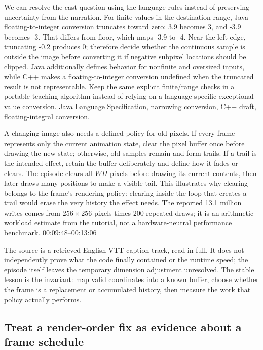 We can resolve the cast question using the language rules instead of preserving uncertainty from the narration. For finite values in the destination range, Java floating-to-integer conversion truncates toward zero: 3.9 becomes 3, and -3.9 becomes -3. That differs from floor, which maps -3.9 to -4. Near the left edge, truncating -0.2 produces 0; therefore decide whether the continuous sample is outside the image before converting it if negative subpixel locations should be clipped. Java additionally defines behavior for nonfinite and oversized inputs, while C++ makes a floating-to-integer conversion undefined when the truncated result is not representable. Keep the same explicit finite/range checks in a portable teaching algorithm instead of relying on a language-specific exceptional-value conversion. \href{https://docs.oracle.com/javase/specs/jls/se21/html/jls-5.html\#jls-5.1.3}{Java Language Specification, narrowing conversion}, \href{https://eel.is/c++draft/conv.fpint}{C++ draft, floating-integral conversion}.

A changing image also needs a defined policy for old pixels. If every frame represents only the current animation state, clear the pixel buffer once before drawing the new state; otherwise, old samples remain and form trails. If a trail is the intended effect, retain the buffer deliberately and define how it fades or clears. The episode clears all \(WH\) pixels before drawing its current contents, then later draws many positions to make a visible tail. This illustrates why clearing belongs to the frame's rendering policy: clearing inside the loop that creates a trail would erase the very history the effect needs. The reported 13.1 million writes comes from \(256\times256\) pixels times 200 repeated draws; it is an arithmetic workload estimate from the tutorial, not a hardware-neutral performance benchmark. \href{https://www.youtube.com/watch?v=dwn_UrItwfw&t=588s}{00:09:48--00:13:06}

The source is a retrieved English VTT caption track, read in full. It does not independently prove what the code finally contained or the runtime speed; the episode itself leaves the temporary dimension adjustment unresolved. The stable lesson is the invariant: map valid coordinates into a known buffer, choose whether the frame is a replacement or accumulated history, then measure the work that policy actually performs.

\subsection{Treat a render-order fix as evidence about a frame schedule}\label{03-visual-computing-i-ch004-treat-a-render-order-fix-as-evidence-about-a-frame-schedule}

